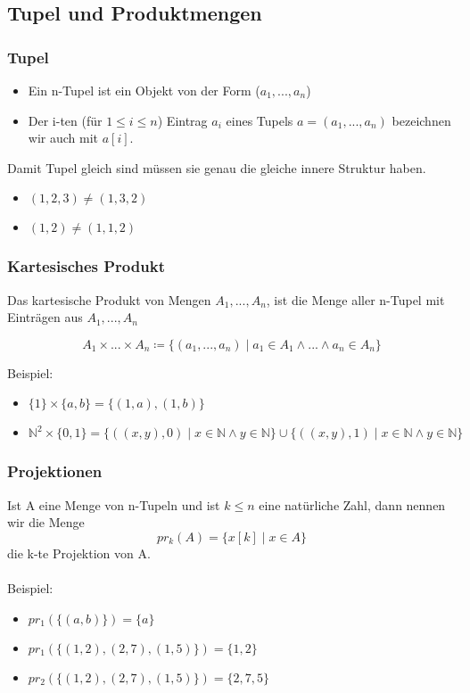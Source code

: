 \subsection{Tupel und Produktmengen}
\subsubsection{Tupel}
\begin{itemize}
    \item Ein n-Tupel ist ein Objekt von der Form ($a_1,...,a_n$)
    \item Der i-ten (für $1 \leq i \leq  n$) Eintrag $a_i$ eines Tupels $a = (a_1,...,a_n)$ bezeichnen wir auch mit $a[i]$.
\end{itemize}
Damit Tupel gleich sind müssen sie genau die gleiche innere Struktur haben.
\begin{itemize}
    \item $(1,2,3) \neq (1,3,2)$
    \item $(1,2) \neq (1,1,2)$
\end{itemize}
\subsubsection{Kartesisches Produkt}
Das kartesische Produkt von Mengen $A_1,...,A_n$, ist die Menge
aller n-Tupel mit Einträgen aus $A_1,...,A_n$

\begin{equation}
    A_1 \times ... \times A_n \coloneqq \{(a_1,...,a_n) \mid a_1 \in A_1 \wedge...\wedge a_n \in A_n\}
\end{equation}

Beispiel:
\begin{itemize}
    \item $\{1\} \times \{a,b\} = \{(1,a),(1,b)\}$
    \item $\mathbb{N}^{2} \times \{0,1\} = \{((x,y),0) \mid x \in \mathbb{N} \wedge y \in \mathbb{N}\} \cup \{((x,y),1) \mid x \in \mathbb{N} \wedge y \in \mathbb{N}\} $
\end{itemize}
\subsubsection{Projektionen}
Ist A eine Menge von n-Tupeln und ist $k \leq n$ eine natürliche Zahl,
dann nennen wir die Menge
\begin{equation}
    pr_{k}(A) = \{x[k] \mid x \in A\}
\end{equation}
die k-te Projektion von A.\\\\
Beispiel:
\begin{itemize}
    \item $pr_{1}(\{(a,b)\}) = \{a\}$
    \item $pr_{1}(\{(1,2),(2,7),(1,5)\}) = \{1,2\}$
    \item $pr_{2}(\{(1,2),(2,7),(1,5)\}) = \{2,7,5\}$
\end{itemize}
